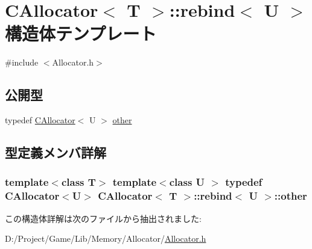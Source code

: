 \hypertarget{struct_c_allocator_1_1rebind}{}\section{C\+Allocator$<$ T $>$\+:\+:rebind$<$ U $>$ 構造体テンプレート}
\label{struct_c_allocator_1_1rebind}


{\ttfamily \#include $<$Allocator.\+h$>$}

\subsection*{公開型}
\begin{DoxyCompactItemize}
\item 
typedef \hyperlink{class_c_allocator}{C\+Allocator}$<$ U $>$ \hyperlink{struct_c_allocator_1_1rebind_a5109d5245fdca0ac2c912fde83828d1d}{other}
\end{DoxyCompactItemize}


\subsection{型定義メンバ詳解}
\hypertarget{struct_c_allocator_1_1rebind_a5109d5245fdca0ac2c912fde83828d1d}{}
\subsubsection[{other}]{\setlength{\rightskip}{0pt plus 5cm}template$<$class T$>$ template$<$class U $>$ typedef {\bf C\+Allocator}$<$U$>$ {\bf C\+Allocator}$<$ T $>$\+::{\bf rebind}$<$ U $>$\+::{\bf other}}\label{struct_c_allocator_1_1rebind_a5109d5245fdca0ac2c912fde83828d1d}


この構造体詳解は次のファイルから抽出されました\+:\begin{DoxyCompactItemize}
\item 
D\+:/\+Project/\+Game/\+Lib/\+Memory/\+Allocator/\hyperlink{_allocator_8h}{Allocator.\+h}\end{DoxyCompactItemize}
